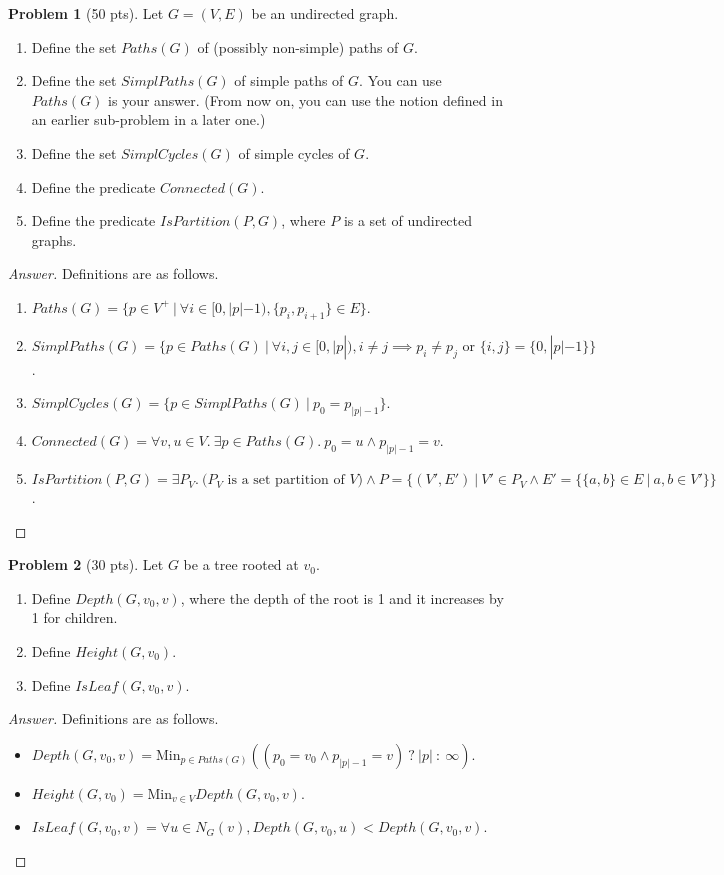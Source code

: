 \documentclass[11pt,a4paper,oneside,microtype,nokorean]{oblivoir}
\theoremstyle{definition}
\newtheorem{problem}{Problem}
\begin{document}
\begin{problem}[50 pts]
  Let $G = (V,E)$ be an undirected graph.

  \begin{enumerate}
  \item Define the set $Paths(G)$ of (possibly non-simple) paths of $G$.
  \item Define the set $SimplPaths(G)$ of simple paths of $G$.  You can use $Paths(G)$ is your
    answer.  (From now on, you can use the notion defined in an earlier sub-problem in a later one.)
  \item Define the set $SimplCycles(G)$ of simple cycles of $G$.
  \item Define the predicate $Connected(G)$.
  \item Define the predicate $IsPartition(P, G)$, where $P$ is a set of undirected graphs.
  \end{enumerate}
\end{problem}
\begin{proof}[Answer]
  Definitions are as follows.
  \begin{enumerate}
  \item $Paths(G) = \{p \in V^+~|~\forall i \in [0,|p|-1), \{p_i,p_{i+1}\} \in E \}$.
  \item
    $SimplPaths(G) = \{p \in Paths(G)~|~ \forall i,j \in [0,|p|), i \neq j \implies p_i \neq p_j
    \mbox{~or~} \{i,j\} = \{0,|p|-1\} \}$.
  \item $SimplCycles(G) = \{p \in SimplPaths(G)~|~ p_0 = p_{|p|-1} \}$.
  \item $Connected(G) = \forall v,u \in V.~\exists p \in Paths(G).~p_0 = u \land p_{|p|-1} = v$.
  \item $IsPartition(P,G) = \exists P_V.~\mbox{($P_V$ is a set partition of $V$)} \land P = \{(V',E')~|~V' \in P_V \land E' = \{\{a,b\} \in E~|~a,b \in V'\}\}$.
  \end{enumerate}
\end{proof}


\begin{problem}[30 pts]
  Let $G$ be a tree rooted at $v_0$.

  \begin{enumerate}
  \item Define $Depth(G, v_0, v)$, where the depth of the root is 1 and it increases by 1 for
    children.
  \item Define $Height(G, v_0)$.
  \item Define $IsLeaf(G, v_0, v)$.
  \end{enumerate}
\end{problem}
\begin{proof}[Answer]
  Definitions are as follows.
  \begin{itemize}
  \item $Depth(G,v_0,v) = \mbox{Min}_{p \in Paths(G)} ((p_0 = v_0 \land p_{|p|-1} = v)~?~|p|~:~\infty)$.
  \item $Height(G,v_0) = \mbox{Min}_{v \in V} Depth(G,v_0,v)$.
  \item $IsLeaf(G,v_0,v) = \forall u \in N_G(v), Depth(G,v_0,u) < Depth(G,v_0,v)$.
  \end{itemize}
\end{proof}
\end{document}
